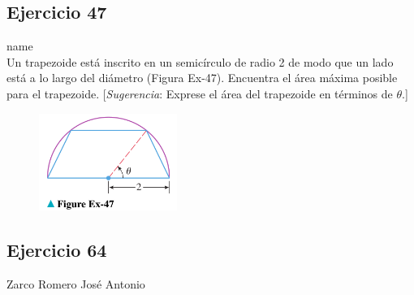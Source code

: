 \documentclass[12pt]{article}
\begin{document}
\subsection{Ejercicio 47} name \\

Un trapezoide está inscrito en un semicírculo de radio 2 de modo que un lado está a lo largo del diámetro (Figura Ex-47). Encuentra el área máxima posible para el trapezoide. [\textit{Sugerencia}: Exprese el área del trapezoide en términos de $\theta$.]
\begin{figure}[H]
\centering
\includegraphics[width=0.4\textwidth]{../img/img_Lista3/3_47.png}
\end{figure}

\subsection{Ejercicio 64} Zarco Romero José Antonio \\
\end{document}
